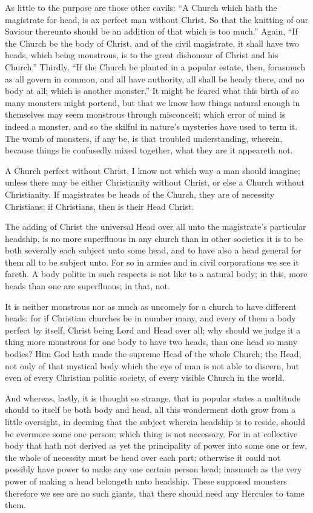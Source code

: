 As little to the purpose are those other cavils: “A Church which hath the magistrate for head, is ax perfect man without Christ. So that the knitting of our Saviour thereunto should be an addition of that which is too much.” Again, “If the Church be the body of Christ, and of the civil magistrate, it shall have two heads, which being monstrous, is to the great dishonour of Christ and his Church.” Thirdly, “If the Church be planted in a popular estate, then, forasmuch as all govern in common, and all have authority, all shall be heady there, and no body at all; which is another monster.” It might be feared what this birth of so many monsters might portend, but that we know how things natural enough in themselves may seem monstrous through misconceit; which error of mind is indeed a monster, and so the skilful in nature’s mysteries have used to term it. The womb of monsters, if any be, is that troubled understanding, wherein, because things lie confusedly mixed together, what they are it appeareth not.

A Church perfect without Christ, I know not which way a man should imagine; unless there may be either Christianity without Christ, or else a Church without Christianity. If magistrates be heads of the Church, they are of necessity Christians; if Christians, then is their Head Christ.

The adding of Christ the universal Head over all unto the magistrate’s particular headship, is no more superfluous in any church than in other societies it is to be both severally each subject unto some head, and to have also a head general for them all to be subject unto. For so in armies and in  civil corporations we see it fareth. A body politic in such respects is not like to a natural body; in this, more heads than one are superfluous; in that, not.

It is neither monstrous nor as much as uncomely for a church to have different heads: for if Christian churches be in number many, and every of them a body perfect by itself, Christ being Lord and Head over all; why should we judge it a thing more monstrous for one body to have two heads, than one head so many bodies? Him God hath made the supreme Head of the whole Church; the Head, not only of that mystical body which the eye of man is not able to discern, but even of every Christian politic society, of every visible Church in the world.

And whereas, lastly, it is thought so strange, that in popular states a multitude should to itself be both body and head, all this wonderment doth grow from a little oversight, in deeming that the subject wherein headship is to reside, should be evermore some one person; which thing is not necessary. For in at collective body that hath not derived as yet the principality of power into some one or few, the whole of necessity must be head over each part; otherwise it could not possibly have power to make any one certain person head; inasmuch as the very power of making a head belongeth unto headship. These supposed monsters therefore we see are no such giants, that there should need any Hercules to tame them.

